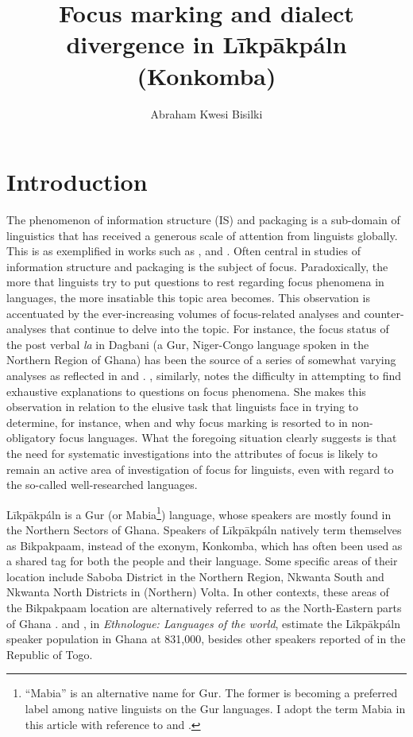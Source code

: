 \documentclass[output=paper,colorlinks,citecolor=brown]{langscibook}
\author{Abraham Kwesi Bisilki\affiliation{University of Education, Winneba, Ghana;The University of Hong Kong}}
\title{Focus marking and dialect divergence in Līkpākpáln (Konkomba)}
\begin{document}
\maketitle

\section{Introduction}\label{sec:bisilki:1}

The phenomenon of information structure (IS) and packaging is a sub-domain of linguistics that has received a generous scale of attention from linguists globally. This is as exemplified in works such as \citet{Lambrecht1994, Krifka2007, SchwabeWinkler2007, Ameka2010, ZimmermannOnea2011}, and \citet{VanPutten2014}. Often central in studies of information structure and packaging is the subject of focus. Paradoxically, the more that linguists try to put questions to rest regarding focus phenomena in languages, the more insatiable this topic area becomes. This observation is accentuated by the ever-increasing volumes of focus-related analyses and counter-analyses that continue to delve into the topic. For instance, the focus status of the post verbal \textit{la} in Dagbani (a Gur, Niger-Congo language spoken in the Northern Region of Ghana) has been the source of a series of somewhat varying analyses as reflected in \citet{Olawsky1999,Hudu2012} and \citet{Issah2013Focus}. \Textcite[94]{VanPutten2016}, similarly, notes the difficulty in attempting to find exhaustive explanations to questions on focus phenomena. She makes this observation in relation to the elusive task that linguists face in trying to determine, for instance, when and why focus marking is resorted to in non-obligatory focus languages. What the foregoing situation clearly suggests is that the need for systematic investigations into the attributes of focus is likely to  remain an active area of investigation of focus for linguists, even with regard to the so-called well-researched languages. 

Līkpākpáln is a Gur (or Mabia\footnote{“Mabia” is an alternative name for Gur. The former is becoming a preferred label among native linguists on the Gur languages. I adopt the term Mabia in this article with reference to \citet{Bodomo2017} and \citet[161]{BodomoAbubakari2017}.}) language, whose speakers are mostly found in the Northern Sectors of Ghana. Speakers of Līkpākpáln natively term themselves as Bikpakpaam, instead of the exonym, Konkomba, which has often been used as a shared tag for both the people and their language. Some specific areas of their location include Saboba District in the Northern Region, Nkwanta South and Nkwanta North Districts in (Northern) Volta. In other contexts, these areas of the Bikpakpaam location are alternatively referred to as the North-Eastern parts of Ghana \citep[182]{Schwarz2009}. \citet{SimonsFennig2017} and \citet{SimonsFennig2018}, in \textit{Ethnologue: Languages of the world}, estimate the Līkpākpáln speaker population in Ghana at 831,000, besides other speakers reported of in the Republic of Togo.
\end{document}
